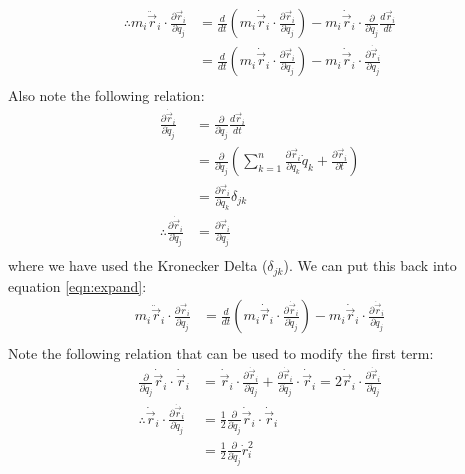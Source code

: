 \begin{align}
\therefore m_i\ddot{\vec{r}}_i\cdot\frac{\partial\vec{r}_i}{\partial q_j} &= \frac{d}{dt}\left(m_i\dot{\vec{r}}_i\cdot\frac{\partial\vec{r}_i}{\partial q_j} \right) - m_i\dot{\vec{r}}_i\cdot\frac{\partial}{\partial q_j}\frac{d\vec{r}_i}{dt}\nonumber\\
&=\frac{d}{dt}\left(m_i\dot{\vec{r}}_i\cdot\frac{\partial\vec{r}_i}{\partial q_j} \right) - m_i\dot{\vec{r}}_i\cdot\frac{\partial\dot{\vec{r}}_i}{\partial q_j}\nonumber\\
\label{eqn:expand}
\end{align}
 Also note the following relation:
\begin{align}
\frac{\partial\dot{\vec{r}}_i}{\partial \dot{q}_j}&=\frac{\partial}{\partial \dot{q}_j}\frac{d\vec{r}_i}{dt}\nonumber\\
&=\frac{\partial}{\partial \dot{q}_j}\left(\sum_{k=1}^n\frac{\partial\vec{r}_i}{\partial q_k}\dot{q}_k+\frac{\partial\vec{r}_i}{\partial t}\right )\nonumber\\
&=\frac{\partial\vec{r}_i}{\partial q_k}\delta_{jk} \nonumber\\
\therefore \frac{\partial\dot{\vec{r}}_i}{\partial \dot{q}_j}&=\frac{\partial\vec{r}_i}{\partial q_j}\nonumber\\
\end{align}
where we have used the Kronecker Delta ($\delta_{jk}$). We can put this back into equation \ref{eqn:expand}:
\begin{align}
m_i\ddot{\vec{r}}_i\cdot\frac{\partial\vec{r}_i}{\partial q_j} &= \frac{d}{dt}\left(m_i\dot{\vec{r}}_i\cdot\frac{\partial\dot{\vec{r}}_i}{\partial \dot{q}_j} \right) - m_i\dot{\vec{r}}_i\cdot\frac{\partial\dot{\vec{r}}_i}{\partial q_j}\nonumber\\
\end{align}
Note the following relation that can be used to modify the first term:
\begin{align}
\frac{\partial}{\partial \dot{q}_j}\dot{\vec{r}}_i\cdot\dot{\vec{r}}_i&=\dot{\vec{r}}_i\cdot\frac{\partial\dot{\vec{r}}_i}{\partial \dot{q}_j}+\frac{\partial\dot{\vec{r}}_i}{\partial \dot{q}_j}\cdot\dot{\vec{r}}_i=2\dot{\vec{r}}_i\cdot\frac{\partial\dot{\vec{r}}_i}{\partial \dot{q}_j}\nonumber\\
\therefore \dot{\vec{r}}_i\cdot\frac{\partial\dot{\vec{r}}_i}{\partial \dot{q}_j}&=\frac{1}{2}\frac{\partial}{\partial \dot{q}_j}\dot{\vec{r}}_i\cdot\dot{\vec{r}}_i\nonumber\\
&=\frac{1}{2}\frac{\partial}{\partial \dot{q}_j}\dot{r}_i^2
\end{align}
